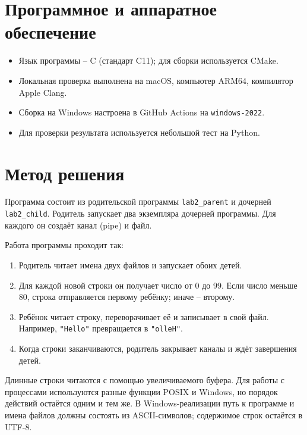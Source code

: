 \documentclass[pdf,unicode,12pt,a4paper,oneside,fleqn]{article}
\begin{document}
\section{Программное и аппаратное обеспечение}
\begin{itemize}[noitemsep,topsep=0pt]
\item Язык программы -- C (стандарт C11); для сборки используется CMake.
\item Локальная проверка выполнена на macOS, компьютер ARM64, компилятор Apple Clang.
\item Сборка на Windows настроена в GitHub Actions на \texttt{windows-2022}.
\item Для проверки результата используется небольшой тест на Python.
\end{itemize}


\section{Метод решения}
Программа состоит из родительской программы \texttt{lab2\_parent} и дочерней
\texttt{lab2\_child}. Родитель запускает два экземпляра дочерней программы.
Для каждого он создаёт канал (pipe) и файл.

Работа программы проходит так:
\begin{enumerate}[noitemsep,topsep=0pt]
\item Родитель читает имена двух файлов и запускает обоих детей.
\item Для каждой новой строки он получает число от 0 до 99. Если число меньше 80,
строка отправляется первому ребёнку; иначе -- второму.
\item Ребёнок читает строку, переворачивает её и записывает в свой файл.
Например, \texttt{"Hello"} превращается в \texttt{"olleH"}.
\item Когда строки заканчиваются, родитель закрывает каналы и ждёт завершения детей.
\end{enumerate}

Длинные строки читаются с помощью увеличиваемого буфера. Для работы с процессами
используются разные функции POSIX и Windows, но порядок действий остаётся одним и тем же.
В Windows-реализации путь к программе и имена файлов должны состоять из
ASCII-символов; содержимое строк остаётся в UTF-8.
\end{document}
